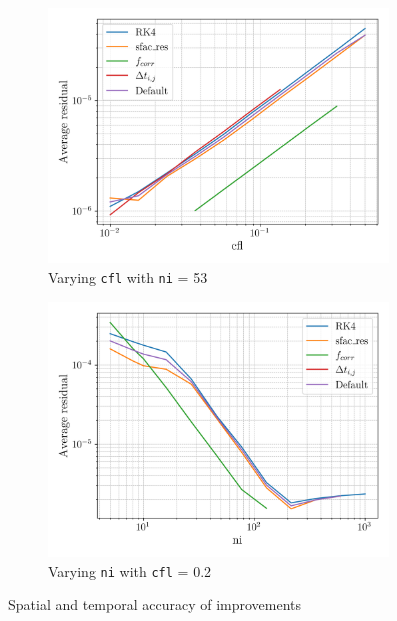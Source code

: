 \documentclass{article}
\begin{document}
\begin{figure}[H]
    \centering
    \begin{subfigure}{0.49\textwidth}
        \centering
        \includegraphics[width=0.99\textwidth]{figures/improvements_cfl_residual.png}
        \caption{Varying \texttt{cfl} with \texttt{ni} = 53}
        \label{fig:improvements_cfl_residual}
    \end{subfigure}
    \begin{subfigure}{0.49\textwidth}
        \centering
        \includegraphics[width=0.99\textwidth]{figures/improvements_ni_residual.png}
        \caption{Varying \texttt{ni} with \texttt{cfl} = 0.2}
        \label{fig:improvements_ni_residual}
    \end{subfigure}
    \caption{Spatial and temporal accuracy of improvements}
\end{figure}
\end{document}
